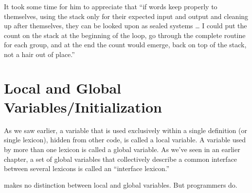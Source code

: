 It took some time for him to appreciate that ``if words keep properly
to themselves, using the stack only for their expected input and output
and cleaning up after themselves, they can be looked upon as sealed
systems \dots{} I could put the count on the stack at the beginning of the
loop, go through the complete routine for each group, and at the end the
count would emerge, back on top of the stack, not a hair out of place.''%

\section{Local and Global Variables/Initialization}%
%
%
%
%

As we saw earlier, a variable that is used exclusively within a single
definition (or single lexicon), hidden from other code, is called a local
variable. A variable used by more than one lexicon is called a global
variable. As we've seen in an earlier chapter, a set of global variables that
collectively describe a common interface between several lexicons is
called an ``interface lexicon.''

\Forth{} makes no distinction between local and global variables.
But \Forth{} programmers do.

